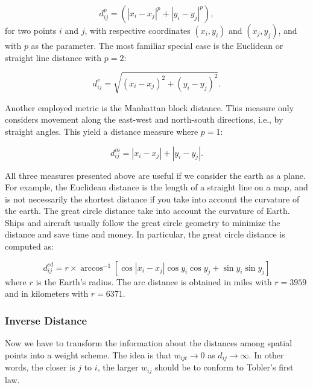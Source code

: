 \begin{equation*}
  d_{ij}^p = \left(\left|x_i - x_j\right|^p + \left|y_i - y_j\right|^p\right),
\end{equation*}
%
for two points $i$ and $j$, with respective coordinates $(x_i, y_i)$ and $(x_j, y_j)$, and with $p$ as the parameter. The most familiar special case is the Euclidean or straight line distance with $p = 2$:

\begin{equation*}
  d_{ij}^e = \sqrt{(x_i - x_j)^2 + (y_i - y_j)^2}.
\end{equation*}

Another employed metric is the Manhattan block distance. This measure only considers movement along the east-west and north-south directions, i.e., by straight angles. This yield a distance measure where $p = 1$:

\begin{equation*}
   d_{ij}^m = \left|x_i - x_j\right| + \left|y_i - y_j\right|.
\end{equation*}

All three measures presented above are useful if we consider the earth as a plane. For example, the Euclidean distance is the length of a straight line on a map, and is not necessarily the shortest distance if you take into account the curvature of the earth. The great circle distance take into account the curvature of Earth. Ships and aircraft usually follow the great circle geometry to minimize the distance and save time and money.  In particular, the great circle distance is computed as:

\begin{equation*}
d_{ij}^{cd} = r \times \arccos^{-1}\left[\cos|x_i - x_j| \cos y_i \cos y_j + \sin y_i \sin y_j \right]
\end{equation*}
%
where $r$ is the Earth's radius. The arc distance is obtained in miles with $r = 3959$ and in kilometers with $r = 6371$.

\subsubsection{Inverse Distance}\label{sec:inverse_distance}

Now we have to transform the information about the distances among spatial points into a weight scheme. The idea is that $w_{ijt}\to 0$ as $d_{ij}\to \infty$. In other words, the closer is $j$ to $i$, the larger $w_{ij}$ should be to conform to Tobler's first law. 

